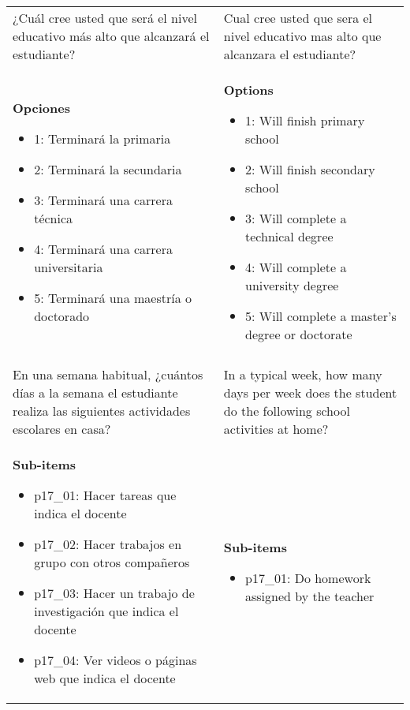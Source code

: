 \documentclass[11pt]{article}
\begin{document}
\begin{longtable}{@{}LL@{}}
¿Cuál cree usted que será el nivel educativo más alto que alcanzará el estudiante? & Cual cree usted que sera el nivel educativo mas alto que alcanzara el estudiante? \\
\textbf{Opciones}\par\begin{itemize}[leftmargin=*]\item 1: Terminará la primaria
\item 2: Terminará la secundaria
\item 3: Terminará una carrera técnica
\item 4: Terminará una carrera universitaria
\item 5: Terminará una maestría o doctorado\end{itemize} & \textbf{Options}\par\begin{itemize}[leftmargin=*]\item 1: Will finish primary school
\item 2: Will finish secondary school
\item 3: Will complete a technical degree
\item 4: Will complete a university degree
\item 5: Will complete a master's degree or doctorate\end{itemize} \\
\addlinespace[4pt]
 \\ 
En una semana habitual, ¿cuántos días a la semana el estudiante realiza las siguientes actividades escolares en casa? & In a typical week, how many days per week does the student do the following school activities at home? \\
\textbf{Sub-items}\par\begin{itemize}[leftmargin=*]\item p17\_01: Hacer tareas que indica el docente
\item p17\_02: Hacer trabajos en grupo con otros compañeros
\item p17\_03: Hacer un trabajo de investigación que indica el docente
\item p17\_04: Ver videos o páginas web que indica el docente\end{itemize} & \textbf{Sub-items}\par\begin{itemize}[leftmargin=*]\item p17\_01: Do homework assigned by the teacher

\end{itemize}
\end{longtable}
\end{document}
